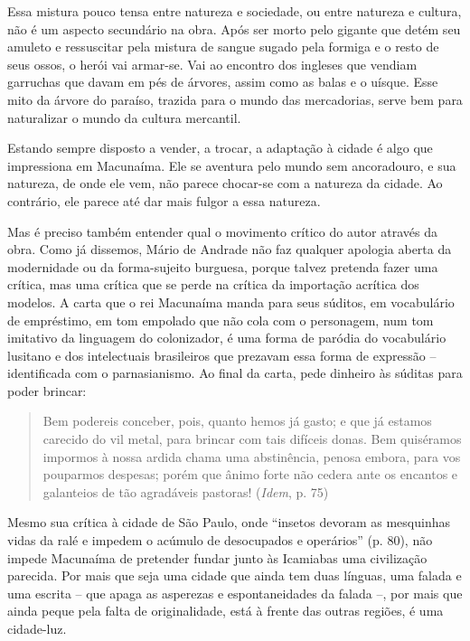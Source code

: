 Essa mistura pouco tensa entre natureza e sociedade, ou entre natureza e
cultura, não é um aspecto secundário na obra. Após ser morto pelo
gigante que detém seu amuleto e ressuscitar pela mistura de sangue
sugado pela formiga e o resto de seus ossos, o herói vai armar-se. Vai
ao encontro dos ingleses que vendiam garruchas que davam em pés de
árvores, assim como as balas e o uísque. Esse mito da árvore do paraíso,
trazida para o mundo das mercadorias, serve bem para naturalizar o mundo
da cultura mercantil.

Estando sempre disposto a vender, a trocar, a adaptação à cidade é algo
que impressiona em Macunaíma. Ele se aventura pelo mundo sem
ancoradouro, e sua natureza, de onde ele vem, não parece chocar-se com a
natureza da cidade. Ao contrário, ele parece até dar mais fulgor a essa
natureza.

Mas é preciso também entender qual o movimento crítico do autor através
da obra. Como já dissemos, Mário de Andrade não faz qualquer apologia
aberta da modernidade ou da forma-sujeito burguesa, porque talvez
pretenda fazer uma crítica, mas uma crítica que se perde na crítica da
importação acrítica dos modelos. A carta que o rei Macunaíma manda para
seus súditos, em vocabulário de empréstimo, em tom empolado que não cola
com o personagem, num tom imitativo da linguagem do colonizador, é uma
forma de paródia do vocabulário lusitano e dos intelectuais brasileiros
que prezavam essa forma de expressão -- identificada com o
parnasianismo. Ao final da carta, pede dinheiro às súditas para poder
brincar:

\begin{quote}
Bem podereis conceber, pois, quanto hemos já gasto; e que já estamos
carecido do vil metal, para brincar com tais difíceis donas. Bem
quiséramos impormos à nossa ardida chama uma abstinência, penosa embora,
para vos pouparmos despesas; porém que ânimo forte não cedera ante os
encantos e galanteios de tão agradáveis pastoras! (\emph{Idem}, p. 75)
\end{quote}

Mesmo sua crítica à cidade de São Paulo, onde ``insetos devoram as
mesquinhas vidas da ralé e impedem o acúmulo de desocupados e
operários'' (p. 80), não impede Macunaíma de pretender fundar junto às
Icamiabas uma civilização parecida. Por mais que seja uma cidade que
ainda tem duas línguas, uma falada e uma escrita -- que apaga as
asperezas e espontaneidades da falada --, por mais que ainda peque pela
falta de originalidade, está à frente das outras regiões, é uma
cidade-luz.

